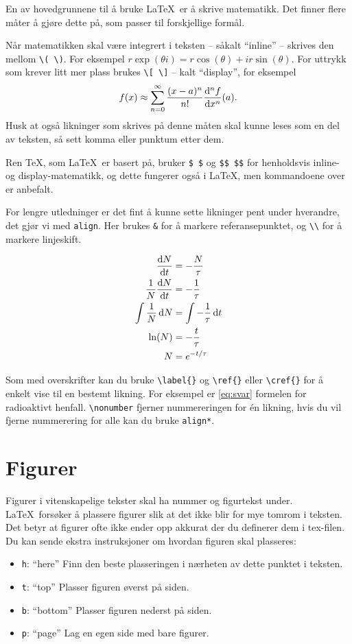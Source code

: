 En av hovedgrunnene til å bruke \LaTeX\ er å skrive matematikk. Det finner flere måter å
gjøre dette på, som passer til forskjellige formål.

Når matematikken skal være integrert i teksten -- såkalt ``inline'' -- skrives den mellom
\lstinline{\( \)}. For eksempel \(r\exp(\theta i) = r\cos(\theta) + ir\sin(\theta)\). For
uttrykk som krever litt mer plass brukes \lstinline{\[ \]} -- kalt ``display'', for eksempel
\[
	f(x) \approx \sum_{n=0}^{\infty} \frac{(x-a)^n}{n!}\dv[n]{f}{x}\qty(a) .
\]
Husk at også likninger som skrives på denne måten skal kunne leses som en del av teksten, så
sett komma eller punktum etter dem.


Ren \TeX, som \LaTeX\ er basert på, bruker \lstinline{$ $} og \lstinline{$$ $$} for henholdsvis
inline- og display-matematikk, og dette fungerer også i \LaTeX, men kommandoene over er anbefalt.

For lengre utledninger er det fint å kunne sette likninger pent under hverandre, det gjør vi
med \lstinline$align$. Her brukes \lstinline{&} for å markere referansepunktet, og \lstinline{\\}
for å markere linjeskift.

\begin{align}
	\dv{N}{t} &= -\frac{N}{\tau}  \label{eq:difflikning} \\
	\frac{1}{N}\dv{N}{t} &= -\frac{1}{\tau}  \nonumber \\
	\int \frac{1}{N} \dd{N} &= \int -\frac{1}{\tau} \dd{t} \\
	\ln(N) &= -\frac{t}{\tau}  \nonumber \\
	N &= e^{-t/\tau} \label{eq:svar}
\end{align}

Som med overskrifter kan du bruke \lstinline$\label{}$ og \lstinline$\ref{}$ eller
\lstinline$\cref{}$ for å enkelt vise til en bestemt likning.
For eksempel er \cref{eq:svar} formelen for radioaktivt henfall.
\lstinline$\nonumber$ fjerner nummereringen for én likning, hvis du vil fjerne nummerering
for alle kan du bruke \lstinline$align*$.

\section{Figurer}

Figurer i vitenskapelige tekster skal ha nummer og figurtekst under.
\LaTeX\ forsøker å plassere figurer slik at det ikke blir for mye tomrom i teksten. Det betyr
at figurer ofte ikke ender opp akkurat der du definerer dem i tex-filen. Du kan sende ekstra
instruksjoner om hvordan figuren skal plasseres:
\begin{itemize}
	\item \texttt{h}: ``here'' Finn den beste plasseringen i nærheten av dette punktet i teksten.
	\item \texttt{t}: ``top'' Plasser figuren øverst på siden.
	\item \texttt{b}: ``bottom'' Plasser figuren nederst på siden.
	\item \texttt{p}: ``page'' Lag en egen side med bare figurer.
\end{itemize}


